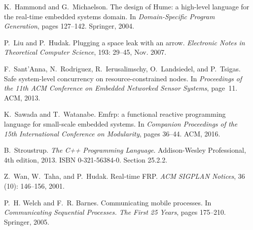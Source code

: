 \documentclass{sigplanconf}
\begin{document}
\begin{thebibliography}{14}
K.~Hammond and G.~Michaelson.
\newblock The design of {Hume}: a high-level language for the real-time
  embedded systems domain.
\newblock In \emph{Domain-Specific Program Generation}, pages 127--142.
  Springer, 2004.

P.~Liu and P.~Hudak.
\newblock Plugging a space leak with an arrow.
\newblock \emph{Electronic Notes in Theoretical Computer Science},
  193: 29--45, Nov. 2007.

F.~Sant'Anna, N.~Rodriguez, R.~Ierusalimschy, O.~Landsiedel, and P.~Tsigas.
\newblock Safe system-level concurrency on resource-constrained nodes.
\newblock In \emph{Proceedings of the 11th ACM Conference on Embedded Networked
  Sensor Systems}, page~11. ACM, 2013.

K.~Sawada and T.~Watanabe.
\newblock Emfrp: a functional reactive programming language for small-scale
  embedded systems.
\newblock In \emph{Companion Proceedings of the 15th International Conference
  on Modularity}, pages 36--44. ACM, 2016.

B.~Stroustrup.
\newblock \emph{The C++ Programming Language}.
\newblock Addison-Wesley Professional, 4th edition, 2013.
\newblock ISBN 0-321-56384-0.
\newblock Section 25.2.2.

Z.~Wan, W.~Taha, and P.~Hudak.
\newblock Real-time {FRP}.
\newblock \emph{ACM SIGPLAN Notices}, 36 (10): 146--156,
  2001.

P.~H. Welch and F.~R. Barnes.
\newblock Communicating mobile processes.
\newblock In \emph{Communicating Sequential Processes. The First 25 Years},
  pages 175--210. Springer, 2005.

\end{thebibliography}
\end{document}
